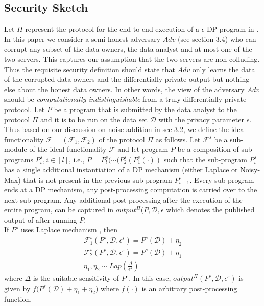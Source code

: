  
 \subsection{\system Security Sketch}
 Let $\Pi$ represent the protocol for the end-to-end execution of a $\epsilon$-DP program in \system.  In this paper we consider a
semi-honest adversary  $Adv$ (see section 3.4) who can corrupt any subset of the data owners, the data analyst and at most one of the two
servers. This captures our assumption that the two servers are non-colluding. Thus the requisite security definition should state that $Adv$ only learns the data of the corrupted data owners and the differentially private output but nothing else about the honest data owners. In other words, the view of the adversary $Adv$ should be \emph{computationally indistinguishable} from a truly differentially private protocol. 
Let $P$ be a program that is submitted by the data analyst to the protocol $\Pi$ and it is to be run on the data set $\mathcal{D}$ with the privacy parameter $\epsilon$. Thus based on our discussion on noise addition in sec 3.2, we define the ideal functionality $\mathcal{F}=(\mathcal{F}_1,\mathcal{F}_2)$ of the protocol $\Pi$ as follows. Let $\mathcal{F}^s$ be a sub-module of the ideal functionality $\mathcal{F}$ and let program $P$ be a composition of sub-programs $P^s_i, i \in [l]$, i.e., $P=P^s_l(\cdots (P^s_2(P^s_1(\cdot))$   such that the sub-program $P^s_i$ has a single additional instantiation of a DP mechanism (either Laplace or Noisy-Max) that is not present in the previous sub-program $P^s_{i-1}$. Every sub-program ends at a DP mechanism, any post-processing computation is carried over to the next sub-program. Any additional post-processing after the execution of the entire program, can be captured in $output^\Pi(P,\mathcal{D},\epsilon$  which denotes the published output of \system after running $P$.
\\If $P^s$ uses Laplace mechanism \cite{Dork}, then
\begin{gather} 
\mathcal{F}^s_1(P^s,\mathcal{D},\epsilon^s)=P^s(\mathcal{D})+\eta_2\\\mathcal{F}^s_2(P^s,\mathcal{D},\epsilon^s)=P^s(\mathcal{D})+\eta_1\\ \eta_1, \eta_2 \sim Lap(\frac{\Delta}{\epsilon^s})\end{gather}  where  $\Delta$  is the suitable sensitivity of $P^s$. In this case, $output^{\Pi}(P^s,\mathcal{D},\epsilon^s)$  is given by $f\big(P^s(\mathcal{D})+\eta_1+\eta_2\big)$ where $f(\cdot)$ is an arbitrary post-processing function. \\
